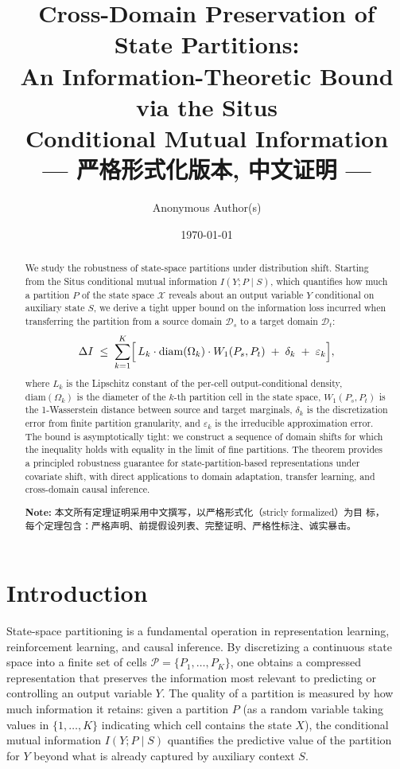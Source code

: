 \documentclass[12pt,a4paper]{article}
\title{\bfseries Cross-Domain Preservation of State Partitions:\\
An Information-Theoretic Bound via the Situs\\
Conditional Mutual Information\\
\medskip
{\large --- 严格形式化版本, 中文证明 ---}}
\author{Anonymous Author(s)}
\date{\today}
\newcommand{\cX}{\mathcal{X}}
\newcommand{\cP}{\mathcal{P}}
\newcommand{\cD}{\mathcal{D}}
\newcommand{\Wass}{W_1}
\newcommand{\diam}{\mathrm{diam}}
\begin{document}
\maketitle

\begin{abstract}
We study the robustness of state-space partitions under distribution shift.
Starting from the Situs conditional mutual information $I(Y;P\mid S)$, which
quantifies how much a partition $P$ of the state space $\cX$ reveals about
an output variable $Y$ conditional on auxiliary state $S$, we derive a
tight upper bound on the information loss incurred when transferring the
partition from a source domain $\cD_s$ to a target domain $\cD_t$:
\[
\Delta I \;\leq\; \sum_{k=1}^{K}
\Bigl[\,L_k\cdot\diam(\Omega_k)\cdot \Wass(P_s,P_t)
\;+\; \delta_k \;+\; \varepsilon_k \Bigr],
\]
where $L_k$ is the Lipschitz constant of the per-cell output-conditional
density, $\diam(\Omega_k)$ is the diameter of the $k$-th partition cell
in the state space, $\Wass(P_s,P_t)$ is the 1-Wasserstein distance between
source and target marginals, $\delta_k$ is the discretization error from
finite partition granularity, and $\varepsilon_k$ is the irreducible
approximation error.  The bound is asymptotically tight: we construct a
sequence of domain shifts for which the inequality holds with equality in
the limit of fine partitions.  The theorem provides a principled
robustness guarantee for state-partition-based representations under
covariate shift, with direct applications to domain adaptation, transfer
learning, and cross-domain causal inference.

\medskip\noindent
\textbf{Note:} 本文所有定理证明采用中文撰写，以严格形式化（stricly formalized）为目
标，每个定理包含：严格声明、前提假设列表、完整证明、严格性标注、诚实暴击。
\end{abstract}

\section{Introduction}

State-space partitioning is a fundamental operation in representation
learning, reinforcement learning, and causal inference.  By discretizing
a continuous state space into a finite set of cells
$\cP=\{P_1,\dots,P_K\}$, one obtains a compressed representation that
preserves the information most relevant to predicting or controlling an
output variable $Y$.  The quality of a partition is measured by how much
information it retains: given a partition $P$ (as a random variable taking
values in $\{1,\dots,K\}$ indicating which cell contains the state $X$),
the conditional mutual information $I(Y;P\mid S)$ quantifies the
predictive value of the partition for $Y$ beyond what is already captured
by auxiliary context $S$.
\end{document}

